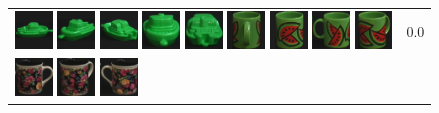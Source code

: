 {\begin{figure}[p]
\begin{tabular}{m{11cm} | m{3cm} |}
\includegraphics[width=1cm]{coil/beeld-55.eps}
\includegraphics[width=1cm]{coil/beeld-57.eps}
\includegraphics[width=1cm]{coil/beeld-58.eps}
\includegraphics[width=1cm]{coil/beeld-56.eps}
\includegraphics[width=1cm]{coil/beeld-59.eps}
\includegraphics[width=1cm]{coil/beeld-35.eps}
\includegraphics[width=1cm]{coil/beeld-32.eps}
\includegraphics[width=1cm]{coil/beeld-31.eps}
\includegraphics[width=1cm]{coil/beeld-33.eps}
& {\scriptsize 0.0}
\\
\includegraphics[width=1cm]{coil/beeld-60.eps}
\includegraphics[width=1cm]{coil/beeld-63.eps}
\includegraphics[width=1cm]{coil/beeld-61.eps}

\end{tabular}
\end{figure}}
